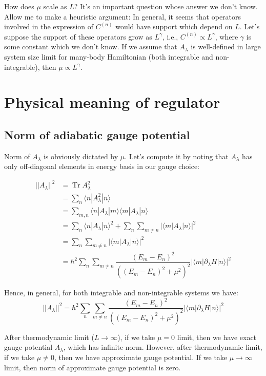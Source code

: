 \documentclass[11pt,a4paper]{article}
\DeclareMathOperator{\Tr}{Tr}
\begin{document}
How does $\mu$ scale as $L$? It's an important question whose answer we don't know. Allow me to make a heuristic argument: In general, it seems that operators involved in the expression of $C^{(n)}$ would have support which depend on $L$. Let's suppose the support of these operators grow as $L^{\gamma}$, i.e., $C^{(n)} \propto L^{\gamma}$, where $\gamma$ is some constant which we don't know. If we assume that $ A_{\lambda}$ is well-defined in large system size limit for many-body Hamiltonian (both integrable and non-integrable), then  $\mu \propto L^{\gamma}$.


\section{ Physical meaning of regulator }
\subsection{Norm of adiabatic gauge potential}
Norm of $A_{\lambda}$ is obviously dictated by $\mu$. Let's compute it by noting that $A_{\lambda}$ has only off-diagonal elements in energy basis in our gauge choice:

\begin{align}
||A_{\lambda}||^2 &= \Tr  A_{\lambda}^2 \\
&= \sum_n \langle n | A^2_{\lambda}| n \rangle \\
&= \sum_{m,n} \langle n | A_{\lambda}| m \rangle  \langle m | A_{\lambda}| n \rangle \\
&= \sum_{n} \langle n | A_{\lambda}| n \rangle ^2 + \sum_n \sum_{m \neq n}  |\langle m | A_{\lambda}| n \rangle|^2 \\
&=  \sum_n \sum_{m \neq n}  |\langle m | A_{\lambda}| n \rangle|^2 \\
&= \hbar^2 \sum_n \sum_{m \neq n}  \dfrac{(E_m-E_n)^2}{((E_m-E_n)^2 + \mu^2)^2} |\langle m | \partial_{\lambda}H| n \rangle|^2
\end{align}

Hence, in general, for both integrable and non-integrable systems we have: 
\begin{equation}
\boxed{||A_{\lambda}||^2 = \hbar^2\sum_n \sum_{m \neq n}  \dfrac{(E_m-E_n)^2}{((E_m-E_n)^2 + \mu^2)^2} |\langle m | \partial_{\lambda}H| n \rangle|^2}
\end{equation}

After thermodynamic limit ($ L \rightarrow \infty$), if we take $\mu=0$ limit, then we have exact gauge potential $A_{\lambda}$, which has infinite norm. However, after thermodynamic limit, if we take $\mu \neq 0$, then we have approximate gauge potential. If we take $\mu \rightarrow \infty$ limit, then norm of approximate gauge potential is zero.
\end{document}
